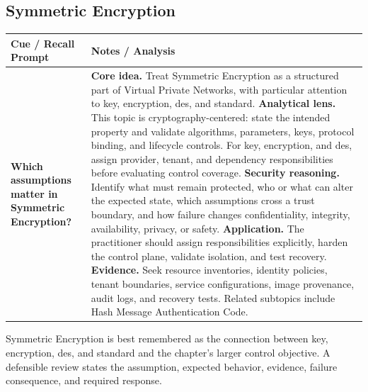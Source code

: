 \documentclass[11pt]{article}
\newcommand{\CornellHeader}{%
\rowcolor{Navy}\color{white}\bfseries Cue / Recall Prompt & \color{white}\bfseries Notes / Analysis\\\hline}
\newcommand{\CornellRow}[2]{%
\cellcolor{CueGray}\RaggedRight\textbf{#1} & \RaggedRight #2\\\hline}
\begin{document}
\subsection*{Symmetric Encryption}
\begin{longtable}{>{\RaggedRight\arraybackslash}p{}|>{\RaggedRight\arraybackslash}p{}}
\CornellHeader
\CornellRow{Which assumptions matter in Symmetric Encryption?}{\textbf{Core idea.} Treat Symmetric Encryption as a structured part of Virtual Private Networks, with particular attention to key, encryption, des, and standard. \textbf{Analytical lens.} This topic is cryptography-centered: state the intended property and validate algorithms, parameters, keys, protocol binding, and lifecycle controls. For key, encryption, and des, assign provider, tenant, and dependency responsibilities before evaluating control coverage. \textbf{Security reasoning.} Identify what must remain protected, who or what can alter the expected state, which assumptions cross a trust boundary, and how failure changes confidentiality, integrity, availability, privacy, or safety. \textbf{Application.} The practitioner should assign responsibilities explicitly, harden the control plane, validate isolation, and test recovery. \textbf{Evidence.} Seek resource inventories, identity policies, tenant boundaries, service configurations, image provenance, audit logs, and recovery tests. Related subtopics include Hash Message Authentication Code.}
\end{longtable}
\begin{topicsummary}
Symmetric Encryption is best remembered as the connection between key, encryption, des, and standard and the chapter's larger control objective. A defensible review states the assumption, expected behavior, evidence, failure consequence, and required response.
\end{topicsummary}
\end{document}
